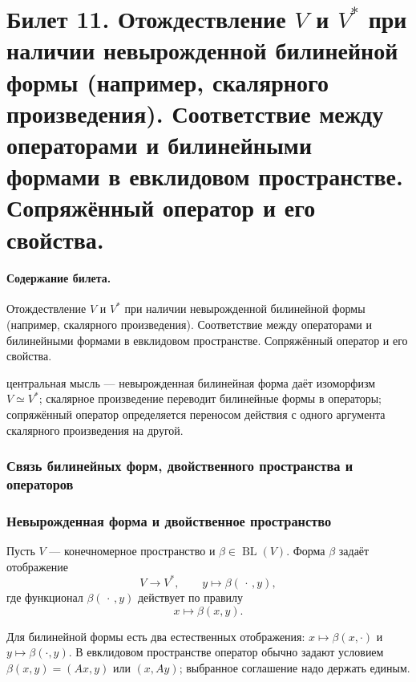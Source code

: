 \documentclass[12pt,a4paper]{article}
\theoremstyle{definition}
\theoremstyle{plain}
\theoremstyle{remark}
\newenvironment{planadd}{\begin{planbox}}{\end{planbox}}
\newenvironment{knowledgefix}{\begin{clarifybox}}{\end{clarifybox}}
\newcommand{\BL}{\operatorname{BL}}
\begin{document}
\clearpage

\section{Билет 11. Отождествление $V$ и $V^*$ при наличии невырожденной билинейной формы (например, скалярного произведения). Соответствие между операторами и билинейными формами в евклидовом пространстве. Сопряжённый оператор и его свойства.}

\paragraph{Содержание билета.} Отождествление $V$ и $V^*$ при наличии невырожденной билинейной формы (например, скалярного произведения). Соответствие между операторами и билинейными формами в евклидовом пространстве. Сопряжённый оператор и его свойства.

\begin{planadd}

центральная мысль — невырожденная билинейная форма даёт изоморфизм $V\simeq V^*$; скалярное произведение переводит билинейные формы в операторы; сопряжённый оператор определяется переносом действия с одного аргумента скалярного произведения на другой.

\end{planadd}

\subsubsection{Связь билинейных форм, двойственного пространства и операторов}

\subsubsection*{Невырожденная форма и двойственное пространство}

Пусть $V$ --- конечномерное пространство и $\beta\in\BL(V)$.
Форма $\beta$ задаёт отображение
\[
    V\to V^*,
    \qquad
    y\mapsto \beta(\,\cdot\,,y),
\]
где функционал $\beta(\,\cdot\,,y)$ действует по правилу
\[
    x\mapsto \beta(x,y).
\]
\begin{knowledgefix}
Для билинейной формы есть два естественных отображения: \(x\mapsto\beta(x,\cdot)\) и \(y\mapsto\beta(\cdot,y)\). В евклидовом пространстве оператор обычно задают условием \(\beta(x,y)=(Ax,y)\) или \((x,Ay)\); выбранное соглашение надо держать единым.
\end{knowledgefix}
\end{document}
